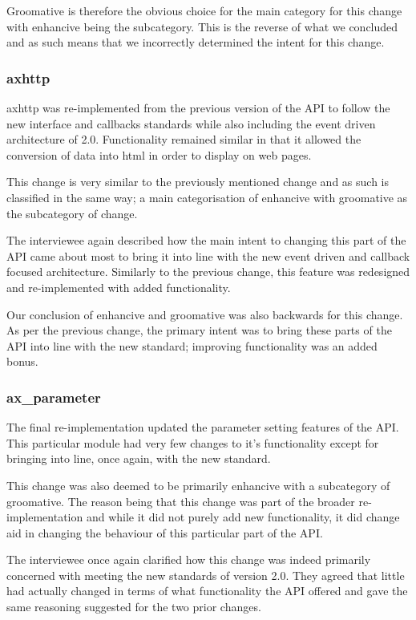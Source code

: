 \documentclass{sig-alternate}
\begin{document}
Groomative is therefore the obvious choice for the main category for this change with enhancive being the subcategory. This is the reverse of what we concluded and as such means that we incorrectly determined the intent for this change.

\subsubsection{axhttp}

axhttp was re-implemented from the previous version of the API to follow the new interface and callbacks standards while also including the event driven architecture of 2.0. Functionality remained similar in that it allowed the conversion of data into html in order to display on web pages. 

This change is very similar to the previously mentioned change and as such is classified in the same way; a main categorisation of enhancive with groomative as the subcategory of change.

The interviewee again described how the main intent to changing this part of the API came about most to bring it into line with the new event driven and callback focused architecture. Similarly to the previous change, this feature was redesigned and re-implemented with added functionality.

Our conclusion of enhancive and groomative was also backwards for this change. As per the previous change, the primary intent was to bring these parts of the API into line with the new standard; improving functionality was an added bonus. 

\subsubsection{ax\_parameter}

The final re-implementation updated the parameter setting features of the API. This particular module had very few changes to it's functionality except for bringing into line, once again, with the new standard.

This change was also deemed to be primarily enhancive with a subcategory of groomative. The reason being that this change was part of the broader re-implementation and while it did not purely add new functionality, it did change aid in changing the behaviour of this particular part of the API.

The interviewee once again clarified how this change was indeed primarily concerned with meeting the new standards of version 2.0. They agreed that little had actually changed in terms of what functionality the API offered and gave the same reasoning suggested for the two prior changes.
\end{document}
